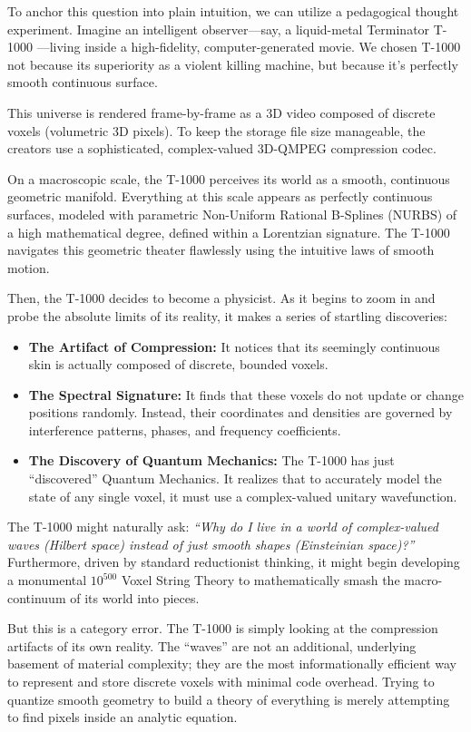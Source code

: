 To anchor this question into plain intuition, we can utilize a pedagogical thought experiment.
Imagine an intelligent observer---say, a liquid-metal Terminator T-1000 ---living inside a high-fidelity, computer-generated movie.
We chosen T-1000 not because its superiority as a violent killing machine, but because it's
perfectly smooth continuous surface.

This universe is rendered frame-by-frame as a 3D video composed of discrete voxels (volumetric 3D pixels).
To keep the storage file size manageable, the creators use a sophisticated, complex-valued 3D-QMPEG compression codec.

On a macroscopic scale, the T-1000 perceives its world as a smooth, continuous geometric manifold.
Everything at this scale appears as perfectly continuous surfaces,
modeled with parametric Non-Uniform Rational B-Splines (NURBS) of a high mathematical degree, defined within a Lorentzian signature.
The T-1000 navigates this geometric theater flawlessly using the intuitive laws of smooth motion.

Then, the T-1000 decides to become a physicist.
As it begins to zoom in and probe the absolute limits of its reality, it makes a series of startling discoveries:
\begin{itemize}
    \item \textbf{The Artifact of Compression:} It notices that its seemingly continuous skin is actually composed of discrete, bounded voxels.
    \item \textbf{The Spectral Signature:} It finds that these voxels do not update or change positions randomly.
      Instead, their coordinates and densities are governed by interference patterns, phases, and frequency coefficients.
    \item \textbf{The Discovery of Quantum Mechanics:} The T-1000 has just ``discovered'' Quantum Mechanics.
      It realizes that to accurately model the state of any single voxel, it must use a complex-valued unitary wavefunction.
\end{itemize}

The T-1000 might naturally ask: \emph{``Why do I live in a world of complex-valued waves (Hilbert space) instead of just smooth shapes (Einsteinian space)?''}
Furthermore, driven by standard reductionist thinking, it might begin developing a monumental $10^{500}$ Voxel String Theory to mathematically smash the macro-continuum of its world into pieces.

But this is a category error.
The T-1000 is simply looking at the compression artifacts of its own reality.
The ``waves'' are not an additional, underlying basement of material complexity; they are the most informationally efficient way to represent and store discrete voxels with minimal code overhead.
Trying to quantize smooth geometry to build a theory of everything is merely attempting to find pixels inside an analytic equation.



